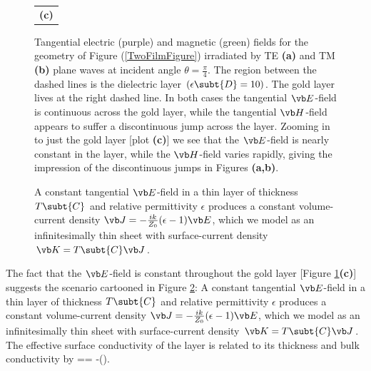 \documentclass{article}
\begin{document}
\begin{figure}[H]
\begin{center}
\begin{tabular}{c}
 \textbf{(c)} 
\end{tabular}
\caption{Tangential electric (purple) and magnetic (green) fields
         for the geometry of Figure (\ref{TwoFilmFigure})
         irradiated by TE \textbf{(a)} and TM \textbf{(b)} 
         plane waves at incident angle $\theta=\frac{\pi}{4}.$
         The region between the dashed lines is the dielectric
         layer $(\epsilon\subt{D}=10)$. The gold layer lives
         at the right dashed line. In both cases the tangential
         $\vb E$-field is continuous across the gold layer,
         while the tangential $\vb H$-field appears 
         to suffer a discontinuous jump across the layer.
         Zooming in to just the gold layer [plot \textbf{(c)}]
         we see that the $\vb E$-field is nearly constant in 
         the layer, while the $\vb H$-field varies rapidly, giving
         the impression of the discontinuous jumps in
         Figures \textbf{(a,b)}.
         }
\label{ThinFilmTransmissionData}
\end{center}
\end{figure}
\begin{figure}[H]
\begin{center}
\caption{A constant tangential $\vb E$-field in a thin layer of thickness
         $T\subt{C}$ and relative permittivity $\epsilon$
         produces a constant volume-current density 
         $\vb J=-\frac{ik}{Z_0}(\epsilon-1)\vb E$,
         which we model as an infinitesimally thin sheet
         with surface-current density $\vb K=T\subt{C}\vb J$.}
\label{SurfaceCurrentSchematic}
\end{center}
\end{figure}
The fact that the $\vb E$-field is constant throughout the gold
layer [Figure \ref{ThinFilmTransmissionData}\textbf{(c)}] 
suggests the scenario cartooned in Figure \ref{SurfaceCurrentSchematic}:
A constant tangential $\vb E$-field in a thin layer of thickness
$T\subt{C}$ and relative permittivity $\epsilon$
produces a constant volume-current density 
$\vb J=-\frac{ik}{Z_0}(\epsilon-1)\vb E$,
which we model as an infinitesimally thin sheet
with surface-current density $\vb K=T\subt{C}\vb J$.
The effective surface conductivity of the layer
is related to its thickness and bulk conductivity by
{\sigma{}==
   -().
}
\end{document}
